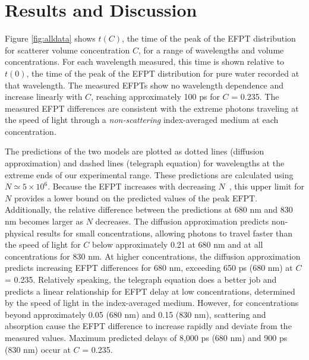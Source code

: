 \section{Results and Discussion}
Figure \ref{fig:alldata} shows $t(C)$, the time of the peak of the EFPT distribution for scatterer volume concentration $C$, for a range of wavelengths and volume concentrations. For each wavelength measured, this time is shown relative to $t(0)$, the time of the peak of the EFPT distribution for pure water recorded at that wavelength. The measured EFPTs show no wavelength dependence and increase linearly with $C$, reaching approximately 100 ps for $C$ = 0.235. The measured EFPT differences are consistent with the extreme photons traveling at the speed of light through a \textit{non-scattering} index-averaged medium at each concentration. 

The predictions of the two models are plotted as dotted lines (diffusion approximation) and dashed lines (telegraph equation) for wavelengths at the extreme ends of our experimental range. These predictions are calculated using $N \simeq 5 \times 10^{6}$. Because the EFPT increases with decreasing $N$~\cite{lawley_distribution_2020}, this upper limit for $N$ provides a lower bound on the predicted values of the peak EFPT. Additionally, the relative difference between the predictions at 680 nm and 830 nm becomes larger as $N$ decreases. The diffusion approximation predicts non-physical results for small concentrations, allowing photons to travel faster than the speed of light for $C$ below approximately 0.21 at 680 nm and at all concentrations for 830 nm.  At higher concentrations, the diffusion approximation predicts increasing EFPT differences  for 680 nm, exceeding 650 ps (680 nm) at $C$ = 0.235. Relatively speaking, the telegraph equation does a better job and predicts a linear relationship for EFPT delay at low concentrations, determined by the speed of light in the index-averaged medium. However, for concentrations beyond approximately 0.05 (680 nm) and 0.15 (830 nm), scattering and absorption cause the EFPT difference to increase rapidly and deviate from the measured values. Maximum predicted delays of 8,000 ps (680 nm) and 900 ps (830 nm) occur at $C$ = 0.235.


